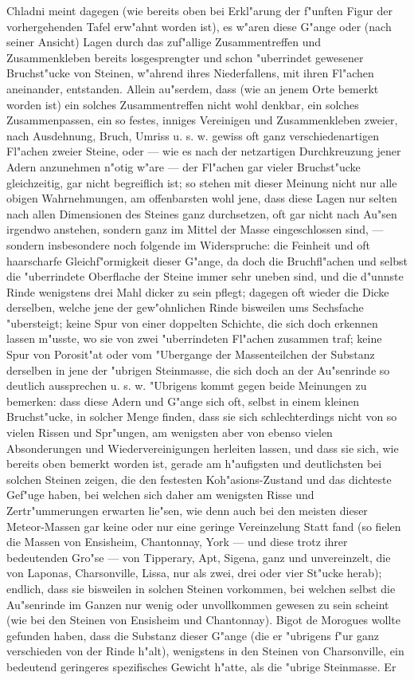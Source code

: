 \documentclass[a4paper, 11pt, oneside, german]{article}
\begin{document}
{{\hspace*{6mm}Chladni meint dagegen (wie bereits oben bei Erkl"arung der f"unften Figur der vorhergehenden Tafel erw"ahnt worden ist), es w"aren diese G"ange oder (nach seiner Ansicht) Lagen durch das zuf"allige Zusammentreffen und Zusammenkleben bereits losgesprengter und schon "uberrindet gewesener Bruchst"ucke von Steinen, w"ahrend ihres Niederfallens, mit ihren Fl"achen aneinander, entstanden. Allein au"serdem, dass (wie an jenem Orte bemerkt worden ist) ein solches Zusammentreffen nicht wohl denkbar, ein solches Zusammenpassen, ein so festes, inniges Vereinigen und Zusammenkleben zweier, nach Ausdehnung, Bruch, Umriss u. s. w. gewiss oft ganz verschiedenartigen Fl"achen zweier Steine, oder --- wie es nach der netzartigen Durchkreuzung jener Adern anzunehmen n"otig w"are --- der Fl"achen gar vieler Bruchst"ucke gleichzeitig, gar nicht begreiflich ist; so stehen mit dieser Meinung nicht nur alle obigen Wahrnehmungen, am offenbarsten wohl jene, dass diese Lagen nur selten nach allen Dimensionen des Steines ganz durchsetzen, oft gar nicht nach Au"sen irgendwo anstehen, sondern ganz im Mittel der Masse eingeschlossen sind, --- sondern insbesondere noch folgende im Widerspruche: die Feinheit und oft haarscharfe Gleichf"ormigkeit dieser G"ange, da doch die Bruchfl"achen und selbst die "uberrindete Oberflache der Steine immer sehr uneben sind, und die d"unnste Rinde wenigstens drei Mahl dicker zu sein pflegt; dagegen oft wieder die Dicke derselben, welche jene der gew"ohnlichen Rinde bisweilen ums Sechsfache "ubersteigt; keine Spur von einer doppelten Schichte, die sich doch erkennen lassen m"usste, wo sie von zwei "uberrindeten Fl"achen zusammen traf; keine Spur von Porosit"at oder vom "Ubergange der Massenteilchen der Substanz derselben in jene der "ubrigen Steinmasse, die sich doch an der Au"senrinde so deutlich aussprechen u. s. w. "Ubrigens kommt gegen beide Meinungen zu bemerken: dass diese Adern und G"ange sich oft, selbst in einem kleinen Bruchst"ucke, in solcher Menge finden, dass sie sich schlechterdings nicht von so vielen Rissen und Spr"ungen, am wenigsten aber von ebenso vielen Absonderungen und Wiedervereinigungen herleiten lassen, und dass sie sich, wie bereits oben bemerkt worden ist, gerade am h"aufigsten und deutlichsten bei solchen Steinen zeigen, die den festesten Koh"asions-Zustand und das dichteste Gef"uge haben, bei welchen sich daher am wenigsten Risse und Zertr"ummerungen erwarten lie"sen, wie denn auch bei den meisten dieser Meteor-Massen gar keine oder nur eine geringe Vereinzelung Statt fand (so fielen die Massen von Ensisheim, Chantonnay, York --- und diese trotz ihrer bedeutenden Gro"se --- von Tipperary, Apt, Sigena, ganz und unvereinzelt, die von Laponas, Charsonville, Lissa, nur als zwei, drei oder vier St"ucke herab); endlich, dass sie bisweilen in solchen Steinen vorkommen, bei welchen selbst die Au"senrinde im Ganzen nur wenig oder unvollkommen gewesen zu sein scheint (wie bei den Steinen von Ensisheim und Chantonnay). Bigot de Morogues wollte gefunden haben, dass die Substanz dieser G"ange (die er "ubrigens f"ur ganz verschieden von der Rinde h"alt), wenigstens in den Steinen von Charsonville, ein bedeutend geringeres spezifisches Gewicht h"atte, als die "ubrige Steinmasse. Er }}
\end{document}
